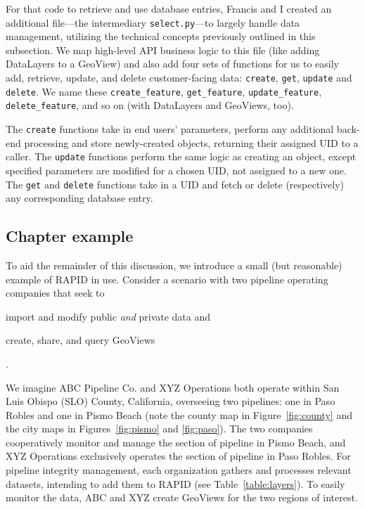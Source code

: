 For that code to retrieve and use database entries, Francis and I created an additional file---the intermediary \texttt{select.py}---to largely handle data management, utilizing the technical concepts previously outlined in this subsection. We map high-level API business logic to this file (like adding DataLayers to a GeoView) and also add four sets of functions for us to easily add, retrieve, update, and delete customer-facing data: \texttt{create}, \texttt{get}, \texttt{update} and \texttt{delete}. We name these \texttt{create\_feature}, \texttt{get\_feature}, \texttt{update\_feature}, \texttt{delete\_feature}, and so on (with DataLayers and GeoViews, too).

The \texttt{create} functions take in end users' parameters, perform any additional back-end processing and store newly-created objects, returning their assigned UID to a caller. The \texttt{update} functions perform the same logic as creating an object, except specified parameters are modified for a chosen UID, not assigned to a new one. The \texttt{get} and \texttt{delete} functions take in a UID and fetch or delete (respectively) any corresponding database entry.


\subsection{Chapter example}
To aid the remainder of this discussion, we introduce a small (but reasonable) example of RAPID in use. Consider a scenario with two pipeline operating companies that seek to
\begin{enumerate*}[label=\itshape\alph*\upshape)]
\item import and modify public \textit{and} private data and
\item create, share, and query GeoViews
\end{enumerate*}.

We imagine ABC Pipeline Co. and XYZ Operations both operate within San Luis Obispo (SLO) County, California, overseeing two pipelines: one in Paso Robles and one in Pismo Beach (note the county map in Figure~\ref{fig:county} and the city maps in Figures~\ref{fig:pismo} and \ref{fig:paso}). The two companies cooperatively monitor and manage the section of pipeline in Pismo Beach, and XYZ Operations exclusively operates the section of pipeline in Paso Robles. For pipeline integrity management, each organization gathers and processes relevant datasets, intending to add them to RAPID (see Table~\ref{table:layers}). To easily monitor the data, ABC and XYZ create GeoViews for the two regions of interest.

